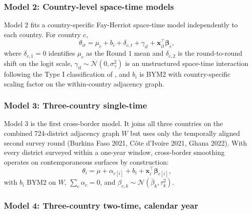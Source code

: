 \documentclass{article}
\begin{document}
\subsubsection{Model 2: Country-level space-time
models}\label{model-2-country-level-space-time-models}

Model 2 fits a country-specific Fay-Herriot space-time model
independently to each country. For country \(c\), \begin{equation}
\theta_{it} = \mu_c + b_i + \delta_{c,t} + \gamma_{it} + \mathbf{x}_{it}^{\top}\bm{\beta}_c,
\end{equation} where \(\delta_{c, 1} = 0\) identifies \(\mu_c\) as the
Round 1 mean and \(\delta_{c, 2}\) is the round-to-round shift on the
logit scale, \(\gamma_{it} \sim \mathcal{N}(0, \sigma_\gamma^2)\) is an
unstructured space-time interaction following the Type I classification
of \citep{knorrheld2000}, and \(b_i\) is BYM2 with country-specific
scaling factor on the within-country adjacency graph.

\subsubsection{Model 3: Three-country
single-time}\label{model-3-three-country-single-time}

Model 3 is the first cross-border model. It joins all three countries on
the combined 724-district adjacency graph \(W\) but uses only the
temporally aligned second survey round (Burkina Faso 2021, Côte d'Ivoire
2021, Ghana 2022). With every district surveyed within a one-year
window, cross-border smoothing operates on contemporaneous surfaces by
construction: \begin{equation}
\theta_i = \mu + \alpha_{c[i]} + b_i + \mathbf{x}_i^{\top}\bm{\beta}_{c[i]},
\end{equation} with \(b_i\) BYM2 on \(W\), \(\sum_c \alpha_c = 0\), and
\(\beta_{c,k} \sim \mathcal{N}(\bar\beta_k, \tau_k^2)\).

\subsubsection{Model 4: Three-country two-time, calendar
year}\label{model-4-three-country-two-time-calendar-year}
\end{document}
